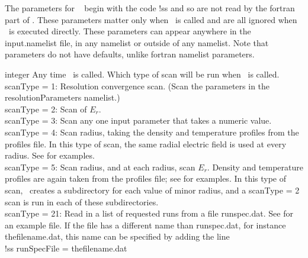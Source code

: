 The parameters for \sfincsScan~ begin with the code {\ttfamily !ss} and so are not read by the fortran part of \sfincs.
These parameters matter only when \sfincsScan~is called and are all ignored when \sfincs~is executed directly.
These parameters can appear anywhere in the {\ttfamily input.namelist} file, in any namelist or outside of any namelist.
Note that \sfincsScan~ parameters do not have defaults, unlike fortran namelist parameters.\\


\myhrule

{integer}
{Any time \sfincsScan~is called.}
{Which type of scan will be run when \sfincsScan~is called. \\

{\ttfamily scanType} = 1:  Resolution convergence scan. (Scan the parameters in the resolutionParameters namelist.)\\

{\ttfamily scanType} = 2:  Scan of $E_r$.\\

{\ttfamily scanType} = 3:  Scan any one input parameter that takes a numeric value.\\

{\ttfamily scanType} = 4:  Scan radius, taking the density and temperature profiles from the {\ttfamily profiles} file.
In this type of scan, the same radial electric field is used at every radius.
See  for examples.\\

{\ttfamily scanType} = 5:  Scan radius, and at each radius, scan $E_r$.  Density and temperature profiles are again
 taken from the {\ttfamily profiles} file; see  for examples.
In this type of scan, \sfincsScan~creates a subdirectory for each value of minor radius, and a
{\ttfamily scanType} = 2 scan is run in each of these subdirectories.
\\

{\ttfamily scanType} = 21: Read in a list of requested runs from a
file {\ttfamily runspec.dat}. See
 for an example file. If the
file has a different name than {\ttfamily runspec.dat}, for instance
{\ttfamily thefilename.dat}, this name can be
specified by adding the line\\
{\ttfamily
!ss runSpecFile = thefilename.dat\\
}
}



